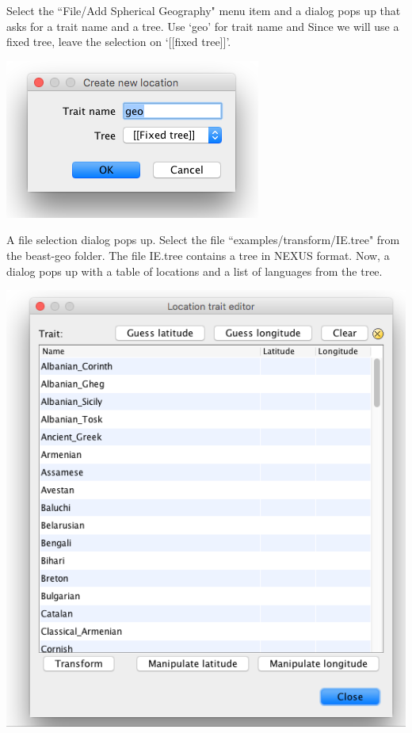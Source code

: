 \documentclass{article}
\begin{document}
Select the ``File/Add Spherical Geography" menu item  and a dialog pops up that asks for a trait name and a tree. Use `geo' for trait name and Since we will use a fixed tree, leave the selection on `[[fixed tree]]'.

\begin{center}
\includegraphics[scale=0.4]{figures/BEAUti_transform1}
\end{center}

A file selection dialog pops up. Select the file ``examples/transform/IE.tree" from the beast-geo folder. The file IE.tree contains a tree in NEXUS format. Now, a dialog pops up with a table of locations and a list of languages from the tree.

\begin{center}
\includegraphics[scale=0.4]{figures/BEAUti_transform2}
\end{center}
\end{document}

